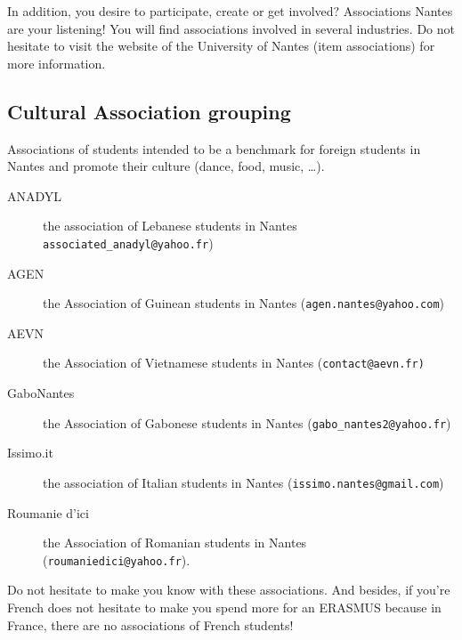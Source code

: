 In addition, you desire to participate, create or get involved?
Associations Nantes are your listening!
You will find associations involved in several industries.
Do not hesitate to visit the website of the University of Nantes (item associations) for more information.


\subsection{Cultural Association grouping}
Associations of students intended to be a benchmark for foreign students in Nantes and promote their culture (dance, food, music, \dots).
\begin{description}
    \item[ANADYL] the association of Lebanese students in Nantes \texttt{associated\_anadyl@yahoo.fr})
    \item[AGEN] the Association of Guinean students in Nantes (\texttt{agen.nantes@yahoo.com})
    \item[AEVN]  the Association of Vietnamese students in Nantes (\texttt{contact@aevn.fr)}
    \item[GaboNantes] the Association of Gabonese students in Nantes (\texttt{gabo\_nantes2@yahoo.fr})
    \item[Issimo.it] the association of Italian students in Nantes (\texttt{issimo.nantes@gmail.com})
    \item[Roumanie d'ici] the Association of Romanian students in Nantes (\texttt{roumaniedici@yahoo.fr}).
\end{description}
Do not hesitate to make you know with these associations.
And besides, if you're French does not hesitate to make you spend more for an ERASMUS because in France, there are no associations of French students!
